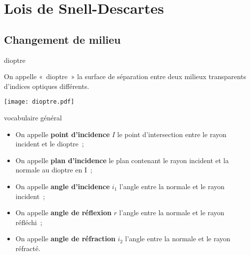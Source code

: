 \documentclass[../main/main.tex]{subfiles}
\begin{document}
\section{Lois de Snell-Descartes}

\subsection{Changement de milieu}

\begin{tcbraster}[raster columns=2, raster equal height=rows]
    \begin{tcolorbox}[blankest, raster multicolumn=1, space to=\myspace]
        \begin{tcbraster}[raster columns=1]
            \begin{defi}[label=def:dioptre, add to natural height=\myspace,
                valign=center]{dioptre}

                On appelle «~dioptre~» la surface de séparation entre deux
                milieux transparents d'indices optiques différents.

                \tcblower
                \vfill
                \begin{center}
                    \texttt{[image: dioptre.pdf]}
                    \label{fig:dioptre}
                \end{center}
            \end{defi}
            \begin{nota}[label=nota:descartes]{vocabulaire général}
                \begin{itemize}

                    \item On appelle \textbf{point d'incidence} $I$ le point
                        d'intersection entre le rayon incident et le dioptre~;
                    \item On appelle \textbf{plan d'incidence} le plan contenant
                        le rayon incident et la normale au dioptre en I~;
                    \item On appelle \textbf{angle d'incidence} $i_1$ l'angle
                        entre la normale et le rayon incident~;
                    \item On appelle \textbf{angle de réflexion} $r$ l'angle
                        entre la normale et le rayon réfléchi~;
                    \item On appelle \textbf{angle de réfraction} $i_2$ l'angle
                        entre la normale et le rayon réfracté.


\end{itemize}
\end{nota}
\end{tcbraster}
\end{tcolorbox}
\end{tcbraster}
\end{document}
